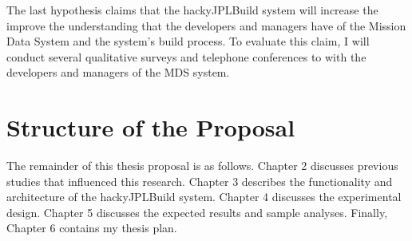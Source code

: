 The last hypothesis claims that the hackyJPLBuild system will increase
the improve the understanding that the developers and managers have of the
Mission Data System and the system's build process.  To evaluate this
claim, I will conduct several qualitative surveys and telephone conferences 
to with the developers and managers of the MDS system.


\section{Structure of the Proposal}
The remainder of this thesis proposal is as follows.  Chapter 2 discusses
previous studies that influenced this research.  Chapter 3 describes the
functionality and architecture of the hackyJPLBuild system.  Chapter 4
discusses the experimental design.  Chapter 5 discusses the expected
results and sample analyses.  Finally, Chapter 6 contains my thesis plan.











